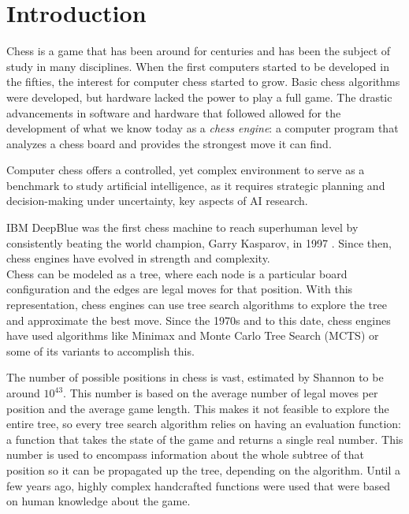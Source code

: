 \section{Introduction}

Chess is a game that has been around for centuries and has been the subject of study in many disciplines. When the first computers started to be developed in the fifties, the interest for computer chess started to grow. Basic chess algorithms were developed, but hardware lacked the power to play a full game. The drastic advancements in software and hardware that followed allowed for the development of what we know today as a \textit{chess engine}: a computer program that analyzes a chess board and provides the strongest move it can find.

Computer chess offers a controlled, yet complex environment to serve as a benchmark to study artificial intelligence, as it requires strategic planning and decision-making under uncertainty, key aspects of AI research.

IBM DeepBlue \cite{deepblue:2002} was the first chess machine to reach superhuman level by consistently beating the world champion, Garry Kasparov, in 1997 \cite{washingtonpost:1997}. Since then, chess engines have evolved in strength and complexity. \\

Chess can be modeled as a tree, where each node is a particular board configuration and the edges are legal moves for that position. With this representation, chess engines can use tree search algorithms to explore the tree and approximate the best move. Since the 1970s and to this date, chess engines have used algorithms like Minimax \cite{minimax-survey:1995} and Monte Carlo Tree Search \cite{mcts-survey:2012} (MCTS) or some of its variants \cite{tree-search-methods:2014,mcts-modifications:2022} to accomplish this.

The number of possible positions in chess is vast, estimated by Shannon \cite{shannon:1950} to be around $10^{43}$. This number is based on the average number of legal moves per position and the average game length. This makes it not feasible to explore the entire tree, so every tree search algorithm relies on having an evaluation function: a function that takes the state of the game and returns a single real number. This number is used to encompass information about the whole subtree of that position so it can be propagated up the tree, depending on the algorithm. Until a few years ago, highly complex handcrafted functions were used that were based on human knowledge about the game. \\

